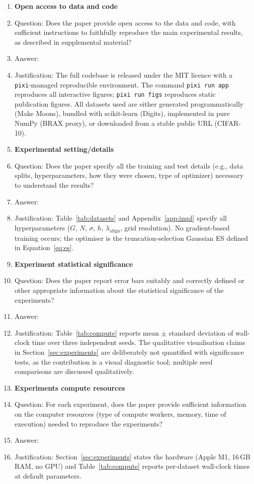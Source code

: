 \begin{enumerate}
\item {\bf Open access to data and code}
    \item[] Question: Does the paper provide open access to the data and code, with sufficient instructions to faithfully reproduce the main experimental results, as described in supplemental material?
    \item[] Answer: \answerYes{}
    \item[] Justification: The full codebase is released under the MIT licence with a \texttt{pixi}-managed reproducible environment. The command \texttt{pixi run app} reproduces all interactive figures; \texttt{pixi run figs} reproduces static publication figures. All datasets used are either generated programmatically (Make Moons), bundled with scikit-learn (Digits), implemented in pure NumPy (BRAX proxy), or downloaded from a stable public URL (CIFAR-10).

\item {\bf Experimental setting/details}
    \item[] Question: Does the paper specify all the training and test details (e.g., data splits, hyperparameters, how they were chosen, type of optimizer) necessary to understand the results?
    \item[] Answer: \answerYes{}
    \item[] Justification: Table~\ref{tab:datasets} and Appendix~\ref{app:impl} specify all hyperparameters ($G$, $N$, $\sigma$, $h$, $\lambda_{\text{align}}$, grid resolution). No gradient-based training occurs; the optimiser is the truncation-selection Gaussian ES defined in Equation~\eqref{eq:es}.

\item {\bf Experiment statistical significance}
    \item[] Question: Does the paper report error bars suitably and correctly defined or other appropriate information about the statistical significance of the experiments?
    \item[] Answer: \answerYes{}
    \item[] Justification: Table~\ref{tab:compute} reports mean $\pm$ standard deviation of wall-clock time over three independent seeds. The qualitative visualisation claims in Section~\ref{sec:experiments} are deliberately not quantified with significance tests, as the contribution is a visual diagnostic tool; multiple seed comparisons are discussed qualitatively.

\item {\bf Experiments compute resources}
    \item[] Question: For each experiment, does the paper provide sufficient information on the computer resources (type of compute workers, memory, time of execution) needed to reproduce the experiments?
    \item[] Answer: \answerYes{}
    \item[] Justification: Section~\ref{sec:experiments} states the hardware (Apple M1, 16\,GB RAM, no GPU) and Table~\ref{tab:compute} reports per-dataset wall-clock times at default parameters.


\end{enumerate}
